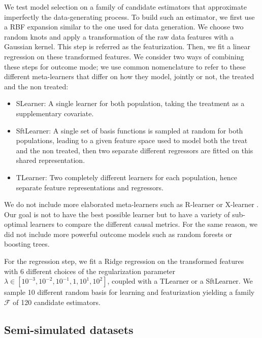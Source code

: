 \documentclass[french,12pt,twoside,a4paper]{book}
\begin{document}
We test model selection on a family of candidate estimators that
approximate imperfectly the data-generating process. To build such an
estimator, we first use a RBF expansion
similar to the one used for data generation.
We choose two random knots and apply a transformation of the raw data features
with a Gaussian kernel. This step
is referred as the featurization. Then, we fit a linear regression on
these
transformed features. We consider two ways of combining these steps for outcome
mode; we use common nomenclature \citep{kunzel_metalearners_2019,shen2023rctrep} to refer
to these different meta-learners that differ on how
they model, jointly or not, the treated and the non treated:
\begin{itemize}
  \item SLearner: A single learner for both population, taking the treatment as
        a supplementary covariate.

  \item SftLearner: A single set of basis functions is sampled at random for both
        populations, leading to a given feature space used to model both the treat and
        the non treated, then two
        separate different regressors are fitted on this shared representation.
  \item TLearner: Two completely different learners for each population, hence
        separate feature representations and regressors.
\end{itemize}

We do not include more elaborated meta-learners such as R-learner
\citep{nie_quasioracle_2017} or X-learner
\citep{kunzel_metalearners_2019}. Our goal is not to have the best possible
learner but to have a variety of sub-optimal learners to compare the
different causal metrics. For the same reason, we did not include more powerful
outcome models such as random forests or boosting trees.

For the regression step, we fit a Ridge regression on the transformed features
with 6 different choices of the regularization parameter $\lambda \in [10^{-3},
    10^{-2}, 10^{-1}, 1, 10^{1}, 10^{2}]$, coupled with a TLearner or a SftLearner.
We sample 10 different random basis for learning and
featurization yielding a family $\mathcal F$ of 120 candidate estimators.
%

\subsection{Semi-simulated datasets}\label{subsec:causal_model_selection:semi_simulated}
\end{document}
